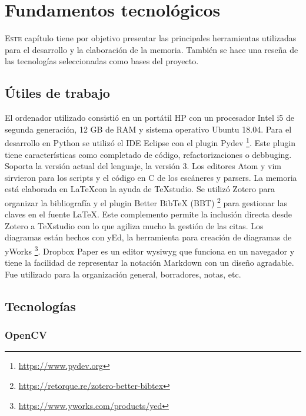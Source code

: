 
\chapter{Fundamentos tecnológicos}
\label{chap:fundamentos-tecnologicos}

\lettrine{E}{ste} capítulo tiene por objetivo presentar las principales herramientas utilizadas para el desarrollo y la elaboración de la memoria. También se hace una reseña de las tecnologías seleccionadas como bases del proyecto.

\section{Útiles de trabajo}

El ordenador utilizado consistió en un portátil HP con un procesador Intel i5 de segunda generación, 12 GB de RAM y sistema operativo Ubuntu 18.04. Para el desarrollo en Python se utilizó el IDE Eclipse con el plugin Pydev
\footnote{\url{https://www.pydev.org}}. Este plugin tiene características como completado de código, refactorizaciones o debbuging. Soporta la versión actual del lenguaje, la versión 3. Los editores Atom y vim sirvieron para los scripts y el código en C de los escáneres y parsers. La memoria está elaborada en \LaTeX con la ayuda de TeXstudio. Se utilizó Zotero para organizar la bibliografía y el plugin Better BibTeX (BBT) 
\footnote{\url{https://retorque.re/zotero-better-bibtex}} para gestionar las claves en el fuente \LaTeX. Este complemento permite la inclusión directa desde Zotero a TeXstudio con lo que agiliza mucho la gestión de las citas. Los diagramas están hechos con yEd, la herramienta para creación de diagramas de yWorks 
\footnote{\url{https://www.yworks.com/products/yed}}. Dropbox Paper es un editor \acrlong{wysiwyg} que funciona en un navegador y tiene la facilidad de representar la notación Markdown con un diseño agradable. Fue utilizado para la organización general, borradores, notas, etc.

\section{Tecnologías}

\subsection{OpenCV}

